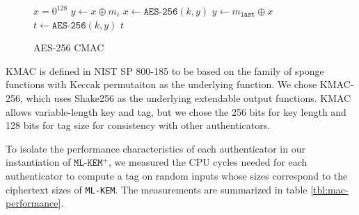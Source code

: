 \documentclass[journal=tches,submission]{iacrtrans}
\begin{document}
\begin{figure}[h]
\begin{minipage}[t]{0.49\textwidth}
\begin{algorithm}[H]
\begin{algorithmic}[1]
                \State $x = 0^{128}$
                    \State $y \leftarrow x \oplus m_i$
                    \State $x \leftarrow \texttt{AES-256}(k, y)$
                \EndFor
                \State $y \leftarrow m_\texttt{last} \oplus x$
                \State $t \leftarrow \texttt{AES-256}(k, y)$
                \State \Return $t$
            \end{algorithmic}
        \end{algorithm}
    \end{minipage}
    \caption{AES-256 CMAC}\label{fig:aes-256-cmac}
\end{figure}

KMAC is defined in NIST SP 800-185 to be based on the family of sponge functions with Keccak permutaiton as the underlying function. We chose KMAC-256, which uses Shake256 as the underlying extendable output functions. KMAC allows variable-length key and tag, but we chose the 256 bits for key length and 128 bits for tag size for consistency with other authenticators.

To isolate the performance characteristics of each authenticator in our instantiation of $\texttt{ML-KEM}^+$, we measured the CPU cycles needed for each authenticator to compute a tag on random inputs whose sizes correspond to the ciphertext sizes of \texttt{ML-KEM}. The measurements are summarized in table \ref{tbl:mac-performance}.
\end{document}
